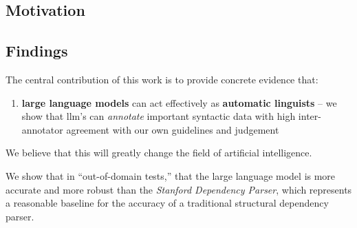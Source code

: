 \label{sec:contributions}

\subsection{Motivation}


\subsection{Findings}
The central contribution of this work is to provide concrete evidence that:
\begin{enumerate}
    \item {\bf large language models} can act effectively as {\bf automatic linguists} -- we show that llm's can {\em annotate} important syntactic data with high inter-annotator agreement with our own guidelines and judgement
\end{enumerate}
We believe that this will greatly change the field of artificial intelligence.

We show that in ``out-of-domain tests,'' that the large language model is more accurate and more robust than the {\em Stanford Dependency Parser}, which represents a reasonable baseline for the accuracy of a traditional structural dependency parser.

